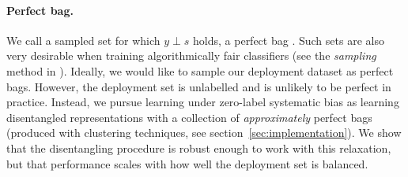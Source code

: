 \paragraph{Perfect bag.}
We call a sampled set for which $y\perp s$ holds, a perfect bag \citep{chouldechova2017fair,kleinberg2016inherent}.
Such sets are also very desirable when training algorithmically fair classifiers
(see the \emph{sampling} method in \citet{kamiran2012data}).
%
%
Ideally, we would like to sample our deployment dataset as perfect bags.
However, the deployment set is unlabelled and is unlikely to be perfect in practice. 
Instead, we pursue learning under zero-label systematic bias as learning disentangled representations with a collection of \emph{approximately} perfect bags (produced with clustering techniques, see section~\ref{sec:implementation}).
We show that the disentangling procedure is robust enough to work with this relaxation, but that performance scales with how well the deployment set is balanced.

